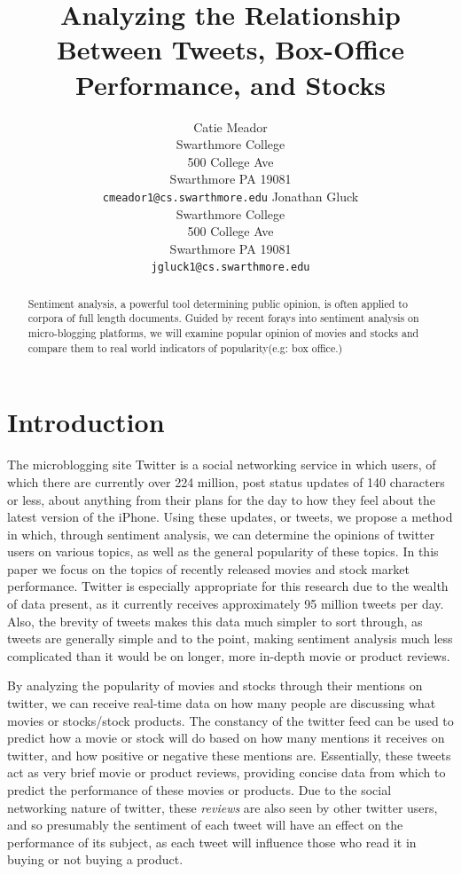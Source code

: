 \documentclass[11pt]{article}
\title{Analyzing the Relationship Between Tweets, Box-Office Performance, and Stocks}
\author{Catie Meador\\
  Swarthmore College\\
  500 College Ave\\
  Swarthmore PA 19081\\
  {\tt cmeador1@cs.swarthmore.edu}  
  \And
  Jonathan Gluck\\
  Swarthmore College\\
  500 College Ave\\
  Swarthmore PA 19081\\
  {\tt jgluck1@cs.swarthmore.edu}  
}
\date{}
\begin{document}
\maketitle

\begin{abstract}
Sentiment analysis, a powerful tool determining public opinion, is often applied to corpora of full length documents. Guided by recent forays into sentiment analysis on micro-blogging platforms, we will examine popular opinion of movies and stocks and compare them to real world indicators of popularity(e.g: box office.)
\end{abstract}

\section{Introduction}

The microblogging site Twitter is a social networking service in which users, of which there are currently over 224 million, post status updates of 140 characters or less, about anything from their plans for the day to how they feel about the latest version of the iPhone.\cite{dsouza-2010}  Using these updates, or tweets, we propose a method in which, through sentiment analysis, we can determine the opinions of twitter users on various topics, as well as the general popularity of these topics.  In this paper we focus on the topics of recently released movies and stock market performance.  Twitter is especially appropriate for this research due to the wealth of data present, as it currently receives approximately 95 million tweets per day.\cite{rao-2010}  Also, the brevity of tweets makes this data much simpler to sort through, as tweets are generally simple and to the point, making sentiment analysis much less complicated than it would be on longer, more in-depth movie or product reviews.

By analyzing the popularity of movies and stocks through their mentions on twitter, we can receive real-time data on how many people are discussing what movies or stocks/stock products.  The constancy of the twitter feed can be used to predict how a movie or stock will do based on how many mentions it receives on twitter, and how positive or negative these mentions are.  Essentially, these tweets act as very brief movie or product reviews, providing concise data from which to predict the performance of these movies or products.  Due to the social networking nature of twitter, these \textit{reviews} are also seen by other twitter users, and so presumably the sentiment of each tweet will have an effect on the performance of its subject, as each tweet will influence those who read it in buying or not buying a product.
\end{document}
